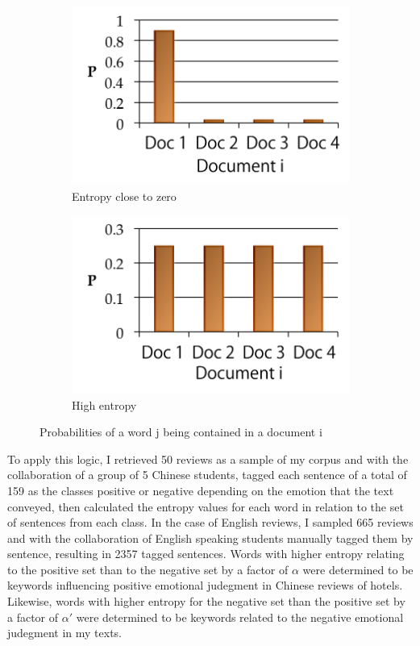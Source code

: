 \documentclass[review]{elsarticle}
\begin{document}
\begin{figure}[bp]
	\centering
	\begin{subfigure}[b]{0.4\linewidth}
		\includegraphics[width=\linewidth]{figures/entropyzero.png}
		\caption{Entropy close to zero}
	\end{subfigure}
	\begin{subfigure}[b]{0.4\linewidth}
		\includegraphics[width=\linewidth]{figures/entropyhigh.png}
		\caption{High entropy}
	\end{subfigure}
\caption{Probabilities of a word j being contained in a document i}
\label{fig:entropygraphs}
\end{figure}

To apply this logic, I retrieved 50 reviews as a sample of my corpus and with the collaboration of a group of 5 Chinese students, tagged each sentence of a total of 159 as the classes positive or negative depending on the emotion that the text conveyed, then calculated the entropy values for each word in relation to the set of sentences from each class. In the case of English reviews, I sampled 665 reviews and with the collaboration of English speaking students manually tagged them by sentence, resulting in 2357 tagged sentences. Words with higher entropy relating to the positive set than to the negative set by a factor of \(\alpha\) were determined to be keywords influencing positive emotional judegment in Chinese reviews of hotels. Likewise, words with higher entropy for the negative set than the positive set by a factor of \(\alpha'\) were determined to be keywords related to the negative emotional judegment in my texts. 
\end{document}
